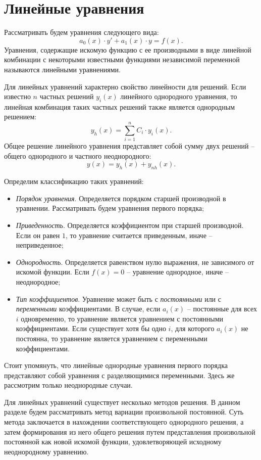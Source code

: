 \section{Линейные уравнения}

	Рассматривать будем уравнения следующего вида:
	\[ a_0(x) \cdot y' + a_1(x) \cdot y = f(x). \]
	Уравнения, содержащие искомую функцию с ее производными в виде линейной комбинации с некоторыми известными функциями независимой переменной называются линейными уравнениями.

	Для линейных уравнений характерно свойство линейности для решений. Если известно $n$ частных решений $y_i(x)$ линейного однородного уравнения, то линейная комбинация таких частных решений также является однородным решением:
	\[ y_h(x) = \sum_{i = 1}^n C_i \cdot y_i(x). \]
	Общее решение линейного уравнения представляет собой сумму двух решений -- общего однородного и частного неоднородного:
	\[ y(x) = y_h(x) + y_{nh}(x). \]

	Определим классификацию таких уравнений:
	\begin{itemize}
		\item \textit{Порядок уравнения}. Определяется порядком старшей производной в уравнении. Рассматривать будем уравнения первого порядка;
		\item \textit{Приведенность}. Определяется коэффициентом при старшей производной. Если он равен $1$, то уравнение считается приведенным, иначе -- неприведенное;
		\item \textit{Однородность}. Определяется равенством нулю выражения, не зависимого от искомой функции. Если $f(x) = 0$ -- уравнение однородное, иначе -- неоднородное;
		\item \textit{Тип коэффициентов}. Уравнение может быть с \textit{постоянными} или с \textit{переменными} коэффициентами. В случае, если $a_i(x)$ -- постоянные для всех $i$ одновременно, то уравнение является уравнением с постоянными коэффициентами. Если существует хотя бы одно $i$, для которого $a_i(x)$ не постоянна, то уравнение является уравнением с переменными коэффициентами.
	\end{itemize}

	Стоит упомянуть, что линейные однородные уравнения первого порядка представляют собой уравнения с разделяющимися переменными. Здесь же рассмотрим только неоднородные случаи.

	Для линейных уравнений существует несколько методов решения. В данном разделе будем рассматривать метод вариации произвольной постоянной. Суть метода заключается в нахождении соответствующего однородного решения, а затем формирования из него общего решения путем представления произвольной постоянной как новой искомой функции, удовлетворяющей исходному неоднородному уравнению.

